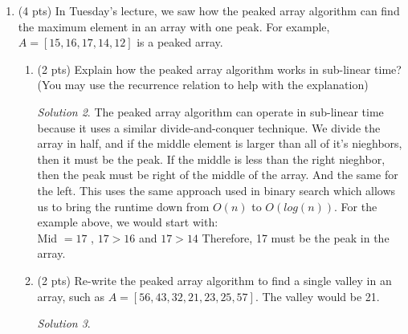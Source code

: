 \documentclass[12pt]{article}
\theoremstyle{remark}
\newtheorem*{solution}{Solution}
\begin{document}
\begin{enumerate}
\begin{solution}
\end{solution}
\pagebreak
\item (4 pts) In Tuesday's lecture, we saw how the peaked array algorithm can find the maximum element in an array with one peak. For example, $A=[15, 16, 17, 14, 12]$ is a peaked array.
\begin{enumerate}[label=(\alph*)]
\item (2 pts) Explain how the peaked array algorithm works in sub-linear time? 
(You may use the recurrence relation to help with the explanation)
\begin{solution}
The peaked array algorithm can operate in sub-linear time because it uses a similar divide-and-conquer technique. We divide the array in half, and if the middle element is larger than all of it's nieghbors, then it must be the peak. If the middle is less than the right nieghbor, then the peak must be right of the middle of the array. And the same for the left. This uses the same approach used in binary search which allows us to bring the runtime down from $O(n)$ to $O(log(n))$. For the example above, we would start with:
\\Mid $= 17$ ,  $17 > 16 $ and  $17 > 14$ Therefore, 17 must be the peak in the array.
\end{solution}

\item (2 pts) Re-write the peaked array algorithm to find a single valley in an array, such as $A=[56, 43, 32, 21, 23, 25, 57]$. The valley would be 21.
\begin{solution}

\end{solution}

\end{enumerate}

\end{enumerate}
\end{document}
